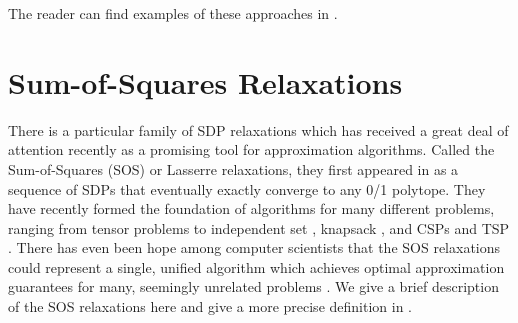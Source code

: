 The reader can find examples of these approaches in \cite{RS09, BPZ15, LRS15, BCVVZ12, BDP15}.


\section{Sum-of-Squares Relaxations}
There is a particular family of SDP relaxations which has received a great deal of attention recently as a promising tool for approximation algorithms. Called the Sum-of-Squares (SOS) or Lasserre relaxations, they first appeared in \cite{Parr00,Las01} as a sequence of SDPs that eventually exactly converge to any 0/1 polytope. They have recently formed the foundation of algorithms for many different problems, ranging from tensor problems \cite{TS15,BKS15,HSS15,PS17} to independent set \cite{CS08}, knapsack \cite{KMN10}, and \textsc{CSP}s and \textsc{TSP} \cite{RT12,LRST14}. There has even been hope among computer scientists that the SOS relaxations could represent a single, unified algorithm which achieves optimal approximation guarantees for many, seemingly unrelated problems \cite{BS14}. We give a brief description of the SOS relaxations here and give a more precise definition in .

